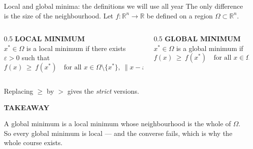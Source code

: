 \documentclass[aspectratio=169,11pt]{beamer}
\newcommand{\kicker}[1]{{\color{hseaccent}\scriptsize\bfseries\MakeUppercase{#1}}}
\newcommand{\takeaway}[2]{%
  \par\smallskip\noindent
  \colorbox{hselight}{\parbox{\dimexpr\textwidth-2\fboxsep}{%
    \kicker{#1}\par\vspace{0.12em}\footnotesize #2}}\par}
\begin{document}
\begin{frame}{Local and global minima: the definitions we will use all year}
  {The only difference is the size of the neighbourhood.}
  \vspace{0.3em}
  Let $f:\mathbb{R}^n\to\mathbb{R}$ be defined on a region $\Omega\subset\mathbb{R}^n$.
  \vspace{0.5em}
  \begin{columns}[T,onlytextwidth]
    \begin{column}{0.5\textwidth}
      \kicker{local minimum}\\[0.3em]
      $x^\ast\in\Omega$ is a local minimum if there exists $\varepsilon>0$ such that
      \[ f(x)\ \ge\ f(x^\ast)\quad\text{for all } x\in\Omega\setminus\{x^\ast\},\ \|x-x^\ast\|<\varepsilon. \]
    \end{column}
    \begin{column}{0.5\textwidth}
      \kicker{global minimum}\\[0.3em]
      $x^\ast\in\Omega$ is a global minimum if
      \[ f(x)\ \ge\ f(x^\ast)\quad\text{for all } x\in\Omega\setminus\{x^\ast\}. \]
    \end{column}
  \end{columns}
  \vspace{0.6em}
  Replacing $\ge$ by $>$ gives the \emph{strict} versions.
  \vspace{0.7em}
  \takeaway{takeaway}{A global minimum is a local minimum whose neighbourhood is the whole of $\Omega$.
    So every global minimum is local --- and the converse fails, which is why the whole course exists.}
\end{frame}
\end{document}
